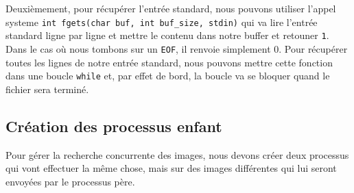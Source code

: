 \documentclass[french]{article}
\begin{document}
Deuxièmement, pour récupérer l'entrée standard, nous pouvons utiliser l'appel systeme \texttt{int fgets(char buf, int buf\_size, stdin)} qui va lire
l'entrée standard ligne par ligne et mettre le contenu dans notre buffer et retouner \texttt{1}. Dans le cas où nous tombons sur un \texttt{EOF}, il renvoie 
simplement 0. Pour récupérer toutes les lignes de notre entrée standard, nous pouvons mettre cette fonction dans une boucle \texttt{while} et, par effet de bord,
la boucle va se bloquer quand le fichier sera terminé. 

\subsection{Création des processus enfant}
Pour gérer la recherche concurrente des images, nous devons créer deux processus qui vont effectuer la même chose, mais sur des images différentes qui lui seront
envoyées par le processus père.
\end{document}
